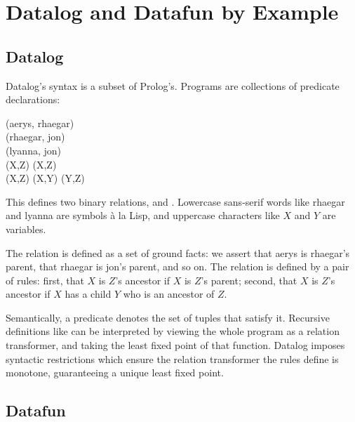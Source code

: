 \section{Datalog and Datafun by Example}
\label{sec:datalog-and-datafun}

\subsection{Datalog}

Datalog's syntax is a subset of Prolog's. Programs are collections of predicate
declarations:

\newcommand\datum[1]{\textsf{#1}}

\begin{code}
  (\datum{aerys}, \datum{rhaegar})\\
  (\datum{rhaegar}, \datum{jon})\\
  (\datum{lyanna}, \datum{jon})\hspace{30em}
  \\[6pt]
  (X,Z) \gets {}(X,Z)\\
  (X,Z) \gets {}(X,Y) \wedge {}(Y,Z)
\end{code}

\noindent
This defines two binary relations,  and . Lowercase
sans-serif words like \datum{rhaegar} and \datum{lyanna} are symbols \`a la
Lisp, and uppercase characters like $X$ and $Y$ are variables.

The  relation is defined as a set of ground facts: we assert that
\datum{aerys} is \datum{rhaegar}'s parent, that \datum{rhaegar} is \datum{jon}'s
parent, and so on. The  relation is defined by a pair of rules:
first, that $X$ is $Z$'s ancestor if $X$ is $Z$'s parent; second, that $X$ is
$Z$'s ancestor if $X$ has a child $Y$ who is an ancestor of $Z$.

Semantically, a predicate denotes the set of tuples that satisfy it. Recursive
definitions like  can be interpreted by viewing the whole program
as a relation transformer, and taking the least fixed point of that function.
Datalog imposes syntactic restrictions which ensure the relation transformer the
rules define is monotone, guaranteeing a unique least fixed point.

\subsection{Datafun}

